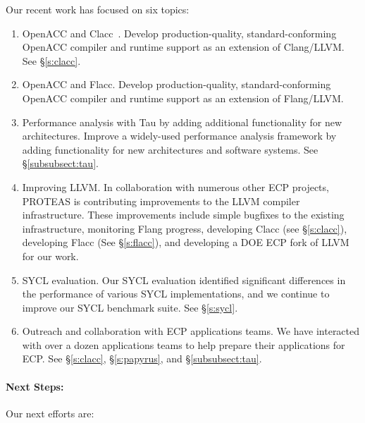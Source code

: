 Our recent work has focused on six topics:

\begin{enumerate}
    
    \item OpenACC and Clacc~\cite{clacc:2018:denny}. Develop production-quality, standard-conforming OpenACC compiler and runtime support as an extension of Clang/LLVM. See \S\ref{s:clacc}.
    
    \item OpenACC and Flacc. Develop production-quality, standard-conforming OpenACC compiler and runtime support as an extension of Flang/LLVM. 

    \item Performance analysis with Tau by adding additional functionality for new architectures. 
    Improve a widely-used performance analysis framework by adding functionality for new architectures and software systems.
    See \S\ref{subsubsect:tau}.

    \item Improving LLVM. In collaboration with numerous other ECP projects, PROTEAS is contributing improvements to the LLVM compiler infrastructure. These improvements include simple bugfixes to the existing infrastructure, monitoring Flang progress, developing Clacc (see \S\ref{s:clacc}), developing Flacc (See \S\ref{s:flacc}), and developing a DOE ECP fork of LLVM for our work.
    
    \item SYCL evaluation. 
    Our SYCL evaluation identified significant differences in the performance of various SYCL implementations, and we continue to improve our SYCL benchmark suite. See \S\ref{s:sycl}.

    \item Outreach and collaboration with ECP applications teams. 
    We have interacted with over a dozen applications teams to help prepare their applications for ECP. See \S\ref{s:clacc}, \S\ref{s:papyrus}, and \S\ref{subsubsect:tau}.
    
\end{enumerate}

\paragraph{Next Steps:}

Our next efforts are:

